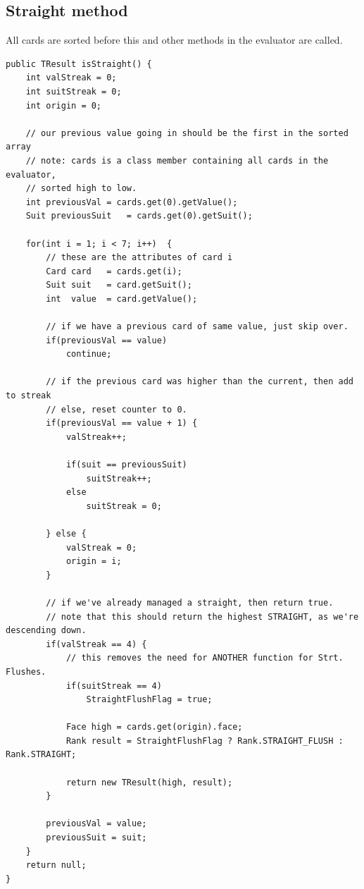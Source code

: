 \documentclass[11pt]{article}
\begin{document}
\newpage 

\subsection{Straight method}

All cards are sorted before this and other methods in the evaluator are called.

\begin{lstlisting}
public TResult isStraight() {
	int valStreak = 0;
	int suitStreak = 0;
	int origin = 0;

	// our previous value going in should be the first in the sorted array
	// note: cards is a class member containing all cards in the evaluator, 
	// sorted high to low.
	int previousVal = cards.get(0).getValue();
	Suit previousSuit   = cards.get(0).getSuit();

	for(int i = 1; i < 7; i++)  {
		// these are the attributes of card i
		Card card   = cards.get(i);
		Suit suit   = card.getSuit();
		int  value  = card.getValue();

		// if we have a previous card of same value, just skip over.
		if(previousVal == value)
			continue;

		// if the previous card was higher than the current, then add to streak
		// else, reset counter to 0.
		if(previousVal == value + 1) {
			valStreak++;

			if(suit == previousSuit)
				suitStreak++;
			else
				suitStreak = 0;

		} else {
			valStreak = 0;
			origin = i;
		}

		// if we've already managed a straight, then return true.
		// note that this should return the highest STRAIGHT, as we're descending down.
		if(valStreak == 4) {
			// this removes the need for ANOTHER function for Strt. Flushes.
			if(suitStreak == 4)
				StraightFlushFlag = true;

			Face high = cards.get(origin).face;
			Rank result = StraightFlushFlag ? Rank.STRAIGHT_FLUSH : Rank.STRAIGHT;

			return new TResult(high, result);
		}

		previousVal = value;
		previousSuit = suit;
	}
	return null;
}
\end{lstlisting}
\newpage
\end{document}
